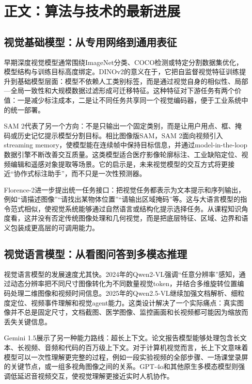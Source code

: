 \documentclass[UTF8,a4paper,12pt]{ctexart}
\newcommand{\model}[1]{\textsf{#1}}
\begin{document}
\section{正文：算法与技术的最新进展}
\subsection{视觉基础模型：从专用网络到通用表征}
早期深度视觉模型通常围绕ImageNet分类、COCO检测或特定分割数据集优化，模型结构与训练目标高度绑定。\model{DINOv2}的意义在于，它把自监督视觉特征训练提升到基础模型层面：模型不依赖人工类别标签，而是通过视觉自身的相似性、局部—全局一致性和大规模数据过滤形成可迁移特征\cite{dinov2}。这种特征对下游任务有两个价值：一是减少标注成本，二是让不同任务共享同一个视觉编码器，便于工业系统中的统一部署。

\model{SAM 2}代表了另一个方向：不是只输出一个固定类别，而是让用户用点、框、掩码或历史记忆提示模型分割目标。相比图像版SAM，\model{SAM 2}面向视频引入streaming memory，使模型能在连续帧中保持目标信息，并通过model-in-the-loop数据引擎不断改善交互质量\cite{sam2}。这类模型适合医疗影像轮廓标注、工业缺陷定位、视频编辑和遥感对象提取等场景。它的启示是，未来视觉模型的交互方式将更接近“协作式标注助手”，而不只是一次性预测器。

\model{Florence-2}进一步提出统一任务接口：把视觉任务都表示为文本提示和序列输出，例如“请描述图像”“请找出某物体位置”“请输出区域掩码”等\cite{florence2}。这与大语言模型的指令范式相似，使视觉系统能够通过自然语言或结构化提示选择任务。从课程知识角度看，这并没有否定传统图像处理和几何视觉，而是把底层特征、区域、边界和语义包装成更高层的可调用能力。

\subsection{视觉语言模型：从看图问答到多模态推理}
视觉语言模型的发展速度尤其快。2024年的\model{Qwen2-VL}强调“任意分辨率”感知，通过动态分辨率把不同尺寸图像转化为不同数量视觉token，并结合多维旋转位置编码处理二维图像和视频时间信息\cite{qwen2vl}。2025年的\model{Qwen2.5-VL}继续加强文档解析、细粒度定位、视频事件理解和视觉agent能力\cite{qwen25vl}。这类设计解决了一个实际痛点：真实图像并不总是固定尺寸，文档截图、医学图像、监控画面和长视频都可能因为缩放而丢失关键信息。

\model{Gemini 1.5}展示了另一种能力路线：超长上下文。论文报告模型能够处理包含长文本、长视频、音频和代码的百万级上下文\cite{gemini15}。对于计算机视觉而言，长上下文意味着模型可以一次性理解更完整的过程，例如一段实验视频的全部步骤、一场课堂录屏的关键节点，或一组多视角图像之间的关系。\model{GPT-4o}和其他原生多模态模型则强调低延迟音视频交互，使视觉理解更接近实时人机协作\cite{gpt4o}。
\end{document}
